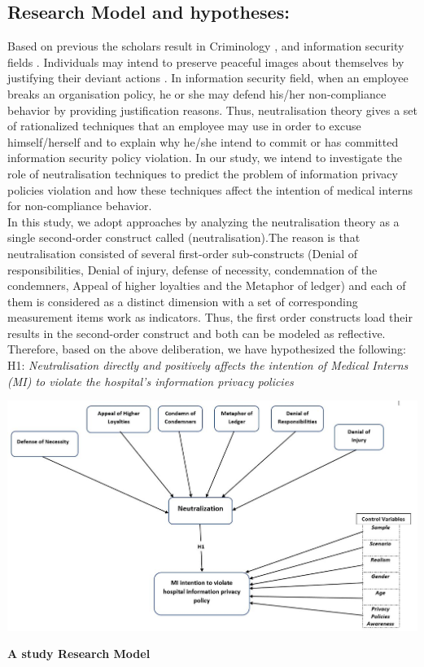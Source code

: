 \subsection{Research Model and hypotheses:}
Based on previous the scholars result in Criminology  \cite{Sykes1957}, and information security fields \cite{Siponen2010,Teh2015,Kim2014}. Individuals may intend to preserve peaceful images about themselves by justifying their deviant actions \cite{Kim2014}. In information security field, when an employee breaks an organisation policy, he or she may defend his/her non-compliance behavior by providing justification reasons. Thus, neutralisation theory gives a set of rationalized techniques that an employee may use in order to excuse himself/herself and to explain why he/she intend to commit or has committed information security policy violation. In our study, we intend to investigate the role of neutralisation techniques to predict the problem of information privacy policies violation and how these techniques affect the intention of medical interns for non-compliance behavior.\\
In this study, we adopt  \cite{Siponen2010,Teh2015} approaches by analyzing the neutralisation theory as a single second-order construct called (neutralisation).The reason is that neutralisation consisted of several first-order sub-constructs (Denial of responsibilities, Denial of injury, defense of necessity, condemnation of the condemners, Appeal of higher loyalties and the Metaphor of ledger) and each of them is considered as a distinct dimension with a set of corresponding measurement items work as indicators. Thus, the first order constructs load their results in the second-order construct and both can be modeled as reflective. Therefore, based on the above deliberation, we have hypothesized the following:
\\H1: \textit{ Neutralisation directly and positively affects the intention of Medical Interns (MI) to violate the hospital's information privacy policies   \textbf{}} 

\graphicspath{ {image/} }
\begin{center}
\includegraphics [scale=0.6]{Research_Model_Fv.JPG}
\end{center}
\begin{center}
	\textbf{A study Research Model}
\end{center}

